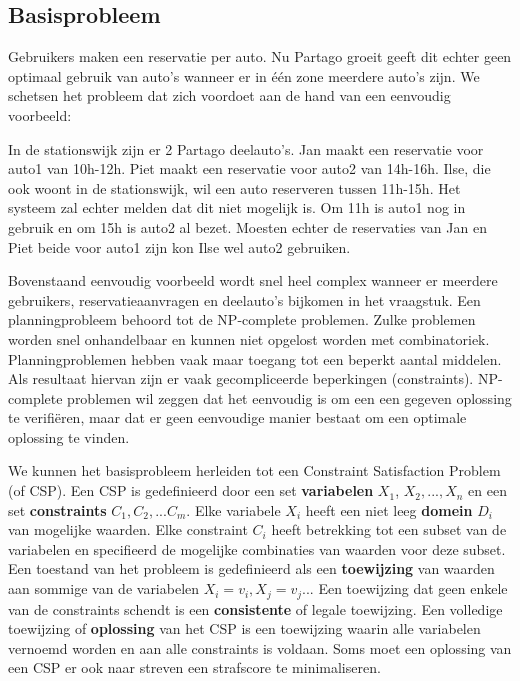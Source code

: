 \subsection{Basisprobleem}
Gebruikers maken een reservatie per auto. Nu Partago groeit geeft dit echter geen optimaal gebruik van auto's wanneer er in één zone meerdere auto's zijn. 
We schetsen het probleem dat zich voordoet aan de hand van een eenvoudig voorbeeld: 

In de stationswijk zijn er 2 Partago deelauto's. Jan maakt een reservatie voor auto1 van 10h-12h. Piet maakt een reservatie voor auto2 van 14h-16h. Ilse, die ook woont in de stationswijk, wil een auto reserveren tussen 11h-15h. Het systeem zal echter melden dat dit niet mogelijk is. Om 11h is auto1 nog in gebruik en om 15h is auto2 al bezet. Moesten echter de reservaties van Jan en Piet beide voor auto1 zijn kon Ilse wel auto2 gebruiken.

Bovenstaand eenvoudig voorbeeld wordt snel heel complex wanneer er meerdere gebruikers, reservatieaanvragen en deelauto's bijkomen in het vraagstuk.
Een planningprobleem behoord tot de NP-complete problemen. Zulke problemen worden snel onhandelbaar en kunnen niet opgelost worden met combinatoriek. Planningproblemen hebben vaak maar toegang tot een beperkt aantal middelen. Als resultaat hiervan zijn er vaak gecompliceerde beperkingen (constraints). \autocite{negnevitsky}
NP-complete problemen wil zeggen dat het eenvoudig is om een een gegeven oplossing te verifiëren, maar dat er geen eenvoudige manier bestaat om een optimale oplossing te vinden. \autocite{manueloptaplanner}

We kunnen het basisprobleem herleiden tot een Constraint Satisfaction Problem (of CSP). Een CSP is gedefinieerd door een set \textbf{variabelen} $X_{1}$, $X_{2},...,X_{n}$ en een set \textbf{constraints} $C_{1}, C_{2},...C_{m}$. Elke variabele $X_{i}$ heeft een niet leeg \textbf{domein} $D_{i}$ van mogelijke waarden. Elke constraint $C_{i}$ heeft betrekking tot een subset van de variabelen en specifieerd de mogelijke combinaties van waarden voor deze subset. Een toestand van het probleem is gedefinieerd als een \textbf{toewijzing} van waarden aan sommige van de variabelen $X_{i} =  v_{i}, X_{j} = v_{j}$... Een toewijzing dat geen enkele van de constraints schendt is een \textbf{consistente} of legale toewijzing. Een volledige toewijzing of \textbf{oplossing} van het CSP is een toewijzing waarin alle variabelen vernoemd worden en aan alle constraints is voldaan. Soms moet een oplossing van een CSP er ook naar streven een strafscore te minimaliseren. \autocite{norvig}


